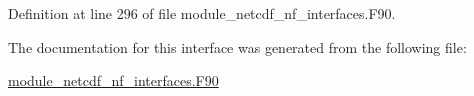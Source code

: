 Definition at line 296 of file module\+\_\+netcdf\+\_\+nf\+\_\+interfaces.\+F90.



The documentation for this interface was generated from the following file\+:\begin{DoxyCompactItemize}
\item 
\hyperlink{module__netcdf__nf__interfaces_8F90}{module\+\_\+netcdf\+\_\+nf\+\_\+interfaces.\+F90}\end{DoxyCompactItemize}
